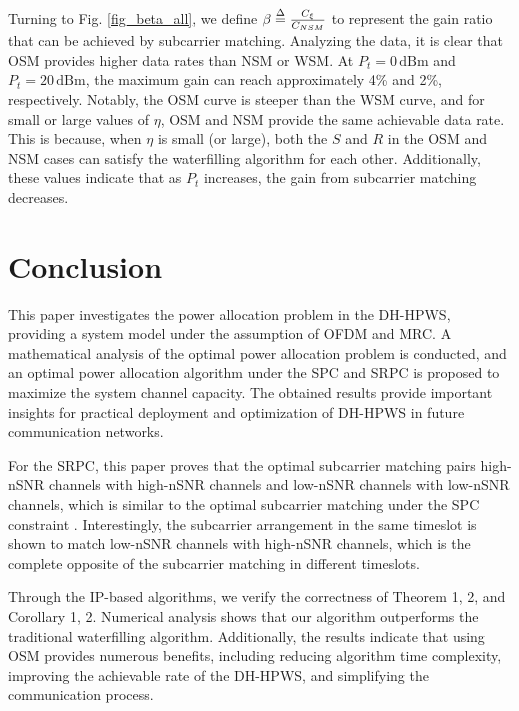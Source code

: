 \documentclass[lettersize,journal]{IEEEtran}
\begin{document}
	Turning to Fig. \ref{fig_beta_all}, we define \( \beta \buildrel \Delta \over = \frac{C_\xi}{C_{NSM}} \) to represent the gain ratio that can be achieved by subcarrier matching. Analyzing the data, it is clear that OSM provides higher data rates than NSM or WSM. At \( P_t = 0 \, \text{dBm} \) and \( P_t = 20 \, \text{dBm} \), the maximum gain can reach approximately 4\% and 2\%, respectively. Notably, the OSM curve is steeper than the WSM curve, and for small or large values of \( \eta \), OSM and NSM provide the same achievable data rate. This is because, when \( \eta \) is small (or large), both the \(S\) and \(R\) in the OSM and NSM cases can satisfy the waterfilling algorithm for each other. Additionally, these values indicate that as \( P_t \) increases, the gain from subcarrier matching decreases.
	
	\section{Conclusion}
	\label{conl}
	This paper investigates the power allocation problem in the DH-HPWS, providing a system model under the assumption of OFDM and MRC. A mathematical analysis of the optimal power allocation problem is conducted, and an optimal power allocation algorithm under the SPC and SRPC  is proposed to maximize the system channel capacity. The obtained results provide important insights for practical deployment and optimization of DH-HPWS in future communication networks.
	
	For the SRPC, this paper proves that the optimal subcarrier matching pairs high-nSNR channels with high-nSNR channels and low-nSNR channels with low-nSNR channels, which is similar to the optimal subcarrier matching under the SPC constraint \cite{wenyi2008}. Interestingly, the subcarrier arrangement in the same timeslot is shown to match low-nSNR channels with high-nSNR channels, which is the complete opposite of the subcarrier matching in different timeslots.
	
	Through the IP-based algorithms, we verify the correctness of Theorem 1, 2, and Corollary 1, 2. Numerical analysis shows that our algorithm outperforms the traditional waterfilling algorithm. Additionally, the results indicate that using OSM provides numerous benefits, including reducing algorithm time complexity, improving the achievable rate of the DH-HPWS, and simplifying the communication process.
	
	
\end{document}
